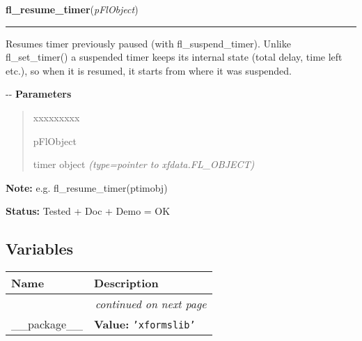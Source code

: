 \hspace{.8\funcindent}\begin{boxedminipage}{\funcwidth}

    \raggedright \textbf{fl\_resume\_timer}(\textit{pFlObject})

    \vspace{-1.5ex}

    \rule{\textwidth}{0.5\fboxrule}
\setlength{\parskip}{2ex}

Resumes timer previously paused (with fl\_suspend\_timer). Unlike
fl\_set\_timer() a suspended timer keeps its internal state (total delay,
time left etc.), so when it is resumed, it starts from where it was
suspended.

-{}-
\setlength{\parskip}{1ex}
      \textbf{Parameters}
      \vspace{-1ex}

      \begin{quote}
        \begin{Ventry}{xxxxxxxxx}

          \item[pFlObject]


timer object
            {\it (type=pointer to xfdata.FL\_OBJECT)}

        \end{Ventry}

      \end{quote}

\textbf{Note:} 
e.g. fl\_resume\_timer(ptimobj)


\textbf{Status:} 
Tested + Doc + Demo = OK


    \end{boxedminipage}



  \subsection{Variables}

    \vspace{-1cm}
\hspace{\varindent}\begin{longtable}{|p{\varnamewidth}|p{\vardescrwidth}|l}
\cline{1-2}
\cline{1-2} \centering \textbf{Name} & \centering \textbf{Description}& \\
\cline{1-2}
\endhead\cline{1-2}\multicolumn{3}{r}{\small\textit{continued on next page}}\\\endfoot\cline{1-2}
\endlastfoot\raggedright \_\-\_\-p\-a\-c\-k\-a\-g\-e\-\_\-\_\- & \raggedright \textbf{Value:} 
{\tt \texttt{'}\texttt{xformslib}\texttt{'}}&\\
\cline{1-2}
\end{longtable}

